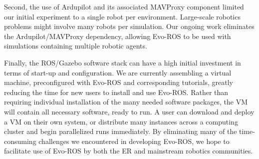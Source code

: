 Second, the use of Ardupilot and its associated MAVProxy component limited our initial experiment to a single robot per environment.
%
Large-scale robotics problems might involve many robots per simulation.  
%
%
Our ongoing work eliminates the Ardupilot/MAVProxy dependency, allowing Evo-ROS to be used with
simulations containing multiple robotic agents.

Finally, the ROS/Gazebo software stack can have a high initial investment in terms of start-up and configuration.  
%
We are currently assembling a virtual machine, preconfigured with Evo-ROS and corresponding tutorials,
greatly reducing the time for new users to install and use Evo-ROS.
%
Rather than requiring individual installation of the many needed software packages, the 
VM will contain all necessary software, ready to run.  
%
A user can download and deploy a VM on their own system, or distribute many instances across a computing cluster and begin parallelized runs immediately.  
%
By eliminating many of the time-consuming challenges we encountered in developing Evo-ROS, we hope to facilitate
use of Evo-ROS by both the ER and mainstream robotics communities.









